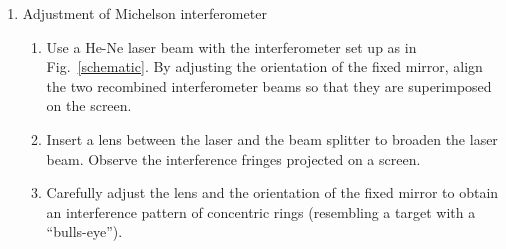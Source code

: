\begin{enumerate}

\item Adjustment of Michelson interferometer

\begin{enumerate}
\item Use a He-Ne laser beam with the interferometer set up as 
in Fig.~\ref{schematic}. By adjusting the orientation of the fixed mirror, 
align the two recombined interferometer beams so that they are 
superimposed on the screen. 
\item Insert a lens between the laser and the beam splitter to 
broaden the laser beam. Observe the interference fringes projected 
on a screen.
\item Carefully adjust the lens and the orientation of the fixed 
mirror to obtain an interference pattern of concentric rings 
(resembling a target with a ``bulls-eye''). 
\end{enumerate}

%



 


\end{enumerate}
